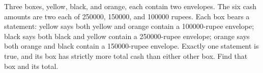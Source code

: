 Three boxes, yellow, black, and orange, each contain two envelopes. The six cash amounts are two each of 250000, 150000, and 100000 rupees. Each box bears a statement: yellow says both yellow and orange contain a 100000-rupee envelope; black says both black and yellow contain a 250000-rupee envelope; orange says both orange and black contain a 150000-rupee envelope. Exactly one statement is true, and its box has strictly more total cash than either other box. Find that box and its total.
